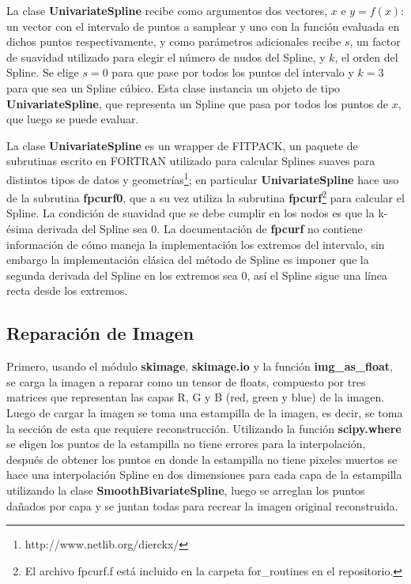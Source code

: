 \documentclass[a4paper, 11pt, spanish]{article}
\begin{document}
La clase \textbf{UnivariateSpline} recibe como argumentos dos vectores, $x$ e $y = f(x)$: un vector con el intervalo de puntos a samplear y uno con la funci\'on evaluada en dichos puntos respectivamente, y como par\'ametros adicionales recibe $s$, un factor de suavidad utilizado para elegir el n\'umero de nudos del Spline, y $k$, el orden del Spline. Se elige $s=0$ para que pase por todos los puntos del intervalo y $k=3$ para que sea un Spline c\'ubico. Esta clase instancia un objeto de tipo \textbf{UnivariateSpline}, que representa un Spline que pasa por todos los puntos de $x$, que luego se puede evaluar.

La clase \textbf{UnivariateSpline} es un wrapper de FITPACK, un paquete de subrutinas escrito en FORTRAN utilizado para calcular Splines suaves para distintos tipos de datos y geometr\'ias\footnote{http://www.netlib.org/dierckx/}; en particular \textbf{UnivariateSpline} hace uso de la subrutina \textbf{fpcurf0}, que a su vez utiliza la subrutina \textbf{fpcurf}\footnote{El archivo fpcurf.f est\'a incluido en la carpeta for\_routines en el repositorio.} para calcular el Spline.
La condici\'on de suavidad que se debe cumplir en los nodos es que la k-\'esima derivada del Spline sea 0. La documentaci\'on de \textbf{fpcurf} no contiene informaci\'on de c\'omo maneja la implementaci\'on los extremos del intervalo, sin embargo la implementaci\'on cl\'asica del m\'etodo de Spline es imponer que la segunda derivada del Spline en los extremos sea 0, as\'i el Spline sigue una l\'inea recta desde los extremos.

\subsection{Reparaci\'on de Imagen}
Primero, usando el m\'odulo \textbf{skimage}, \textbf{skimage.io} y la funci\'on \textbf{img\_as\_float}, se carga la imagen a reparar como un tensor de floats, compuesto por tres matrices que representan las capas R, G y B (red, green y blue) de la imagen. Luego de cargar la imagen se toma una estampilla de la imagen, es decir, se toma la secci\'on de esta que requiere reconstrucci\'on. Utilizando la funci\'on \textbf{scipy.where} se eligen los puntos de la estampilla no tiene errores para la interpolaci\'on, despu\'es de obtener los puntos en donde la estampilla no tiene pixeles muertos se hace una interpolaci\'on Spline en dos dimensiones para cada capa de la estampilla utilizando la clase \textbf{SmoothBivariateSpline}, luego se arreglan los puntos da\~nados por capa y se juntan todas para recrear la imagen original reconstruida.
\end{document}
